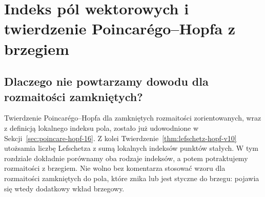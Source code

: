 \chapter{Indeks pól wektorowych i twierdzenie Poincarégo--Hopfa z brzegiem}
\label{ch:poincare-hopf-v11}

\section{Dlaczego nie powtarzamy dowodu dla rozmaitości zamkniętych?}
Twierdzenie Poincarégo--Hopfa dla zamkniętych rozmaitości
zorientowanych, wraz z definicją lokalnego indeksu pola,
zostało już udowodnione w
Sekcji~\ref{sec:poincare-hopf-16}.
Z kolei Twierdzenie~\ref{thm:lefschetz-hopf-v10} utożsamia
liczbę Lefschetza z sumą lokalnych indeksów punktów stałych.
W tym rozdziale dokładnie porównamy oba rodzaje indeksów,
a potem potraktujemy rozmaitości z brzegiem.
Nie wolno bez komentarza stosować wzoru dla rozmaitości zamkniętych
do pola, które znika lub jest styczne do brzegu: pojawia się wtedy
dodatkowy wkład brzegowy.

